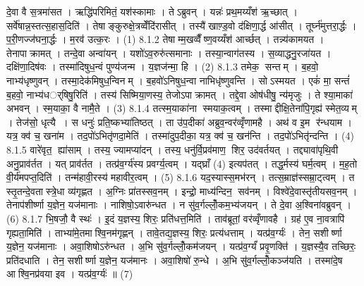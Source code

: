दे॒वा वै स॒त्रमा॑सत । ऋद्धि॑परिमितं॒ यश॑स्कामाः । तेऽब्रुवन् । यन्नः॑ प्रथ॒मय्यँश॑ ऋ॒च्छात् । सर्वे॑षान्न॒स्तत्स॒हास॒दिति॑ । तेषाङ्कुरुक्षे॒त्रव्वेँदि॑रासीत् । तस्यै॑ खाण़्ड॒वो द॑क्षिणा॒र्द्ध आ॑सीत् । तूर्घ्न॑मुत्तरा॒र्द्धः । प॒री॒णज्ज॑घना॒र्द्धः । म॒रव॑ उत्क॒रः । (1)
8.1.2
तेषाम्म॒खव्वैँष्ण॒वय्यँश॑ आर्च्छत् । तन्न्य॑कामयत । तेनापाक्रामत् । तन्दे॒वा अन्वा॑यन् । यशो॑ऽव॒रुरु॑त्समानाः । तस्या॒न्वाग॑तस्य । स॒व्याद्धनु॒रजा॑यत । दक्षि॑णा॒दिष॑वः । तस्मा॑दिषुध॒न्वं पुण्य॑जन्म । य॒ज्ञज॑न्मा॒ हि । (2)
8.1.3
तमेक॒ सन्तम् । ब॒हवो॒ नाभ्य॑धृष्णुवन् । तस्मा॒देक॑मिषुध॒न्विनम् । ब॒हवो॑ऽनिषुध॒न्वा नाभिधृ॑ष्णुवन्ति । सोऽस्मयत । एकं॑ मा॒ सन्तं॑ ब॒हवो॒ नाभ्य॑धर््षिषु॒रिति॑ । तस्य॑ सिष्मिया॒णस्य॒ तेजोऽपाक्रामत् । तद्दे॒वा ओष॑धीषु॒ न्य॑मृजुः । ते श्या॒माका॑ अभवन् । स्म॒याका॒ वै नामै॒ते । (3)
8.1.4
तत्स्म॒याका॑ना स्मयाक॒त्वम् । तस्माद्दीक्षि॒तेना॑पि॒गृह्य॑ स्मेत॒व्यम् । तेज॑सो॒ धृत्यै । स धनुः॑ प्रति॒ष्कभ्या॑तिष्ठत् । ता उ॑प॒दीका॑ अब्रुव॒न्वर॑व्वृँणामहै । अथ॑ व इ॒म र॑न्धयाम । यत्र॒ क्व॑ च॒ खना॑म । तद॒पो॑ऽभितृ॑णदा॒मेति॑ । तस्मा॑दुप॒दीका॒ यत्र॒ क्व॑ च॒ खन॑न्ति । तद॒पो॑ऽभितृ॑न्दन्ति । (4)
8.1.5
वारे॑वृत॒ ह्या॑साम् । तस्य॒ ज्यामप्या॑दन् । तस्य॒ धनु॑र्वि॒प्रव॑माण॒ शिर॒ उद॑वर्तयत् । तद्द्यावा॑पृथि॒वी अनु॒प्राव॑र्तत । यत् प्राव॑र्तत । तत्प्र॑व॒र्ग्य॑स्य प्रवर्ग्य॒त्वम् । यद्घ्राँ (4) इत्यप॑तत् । तद्ध॒र्मस्य॑ घर्म॒त्वम् । म॒ह॒तो वी॒र्य॑मपप्त॒दिति॑ । तन्म॑हावी॒रस्य॑ महावीर॒त्वम् । (5)
8.1.6
यद॒स्यास्स॒मभ॑रन् । तत्स॒म्राज्ञ॑स्सम्रा॒ट्त्वम् । त स्तृ॒तन्दे॒वतास्त्रे॒धा व्य॑गृह्णत । अ॒ग्निः प्रा॑तस्सव॒नम् । इन्द्रो॒ माध्य॑न्दिन॒ सव॑नम् । विश्वे॑दे॒वास्तृ॑तीयसव॒नम् । तेनाप॑शीर्ष्णा य॒ज्ञेन॒ यज॑मानाः । नाशिषो॒ऽवारु॑न्धत । न सु॑व॒र्गल्लोँ॒कम॒भ्य॑जयन् । ते दे॒वा अ॒श्विना॑वब्रुवन् । (6)
8.1.7
भि॒षजौ॒ वै स्थः॑ । इ॒दं य॒ज्ञस्य॒ शिरः॒ प्रति॑धत्त॒मिति॑ । ताव॑ब्रूतां॒ वर॑व्वृँणावहै । ग्रह॑ ए॒व ना॒वत्रापि॑ गृह्यता॒मिति॑ । ताभ्या॑मे॒तमाश्वि॒नम॑गृह्णन् । तावे॒तद्य॒ज्ञस्य॒ शिरः॒ प्रत्य॑धत्ताम् । यत्प्र॑व॒र्ग्यः॑ । तेन॒ सशीर्ष्णा य॒ज्ञेन॒ यज॑मानाः । अवा॒शिषोऽरु॑न्धत । अ॒भि सु॑व॒र्गल्लोँ॒कम॑जयन् । यत्प्र॑व॒र्ग्यं॑ प्रवृ॒णक्ति॑ । य॒ज्ञस्यै॒व तच्छिरः॒ प्रति॑दधाति । तेन॒ सशीर्ष्णा य॒ज्ञेन॒ यज॑मानः । अवा॒शिषो॑ रु॒न्धे । अ॒भि सु॑व॒र्गल्लोँ॒कञ्ज॑यति । तस्मा॑दे॒ष आश्वि॒नप्र॑वया इव । यत्प्र॑व॒र्ग्यः॑ ॥ (7)
\anuvakamend


